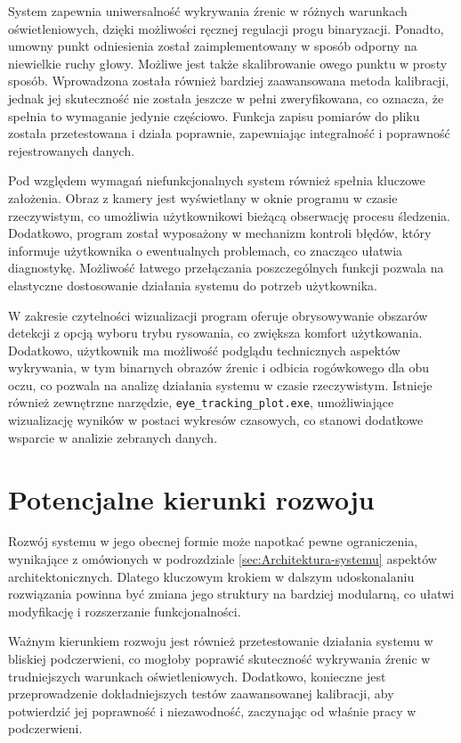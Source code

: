 \documentclass[a4paper,twoside,12pt]{book}
\begin{document}
System zapewnia uniwersalność wykrywania źrenic w różnych warunkach oświetleniowych, dzięki możliwości ręcznej regulacji progu binaryzacji. Ponadto, umowny punkt odniesienia został zaimplementowany w sposób odporny na niewielkie ruchy głowy. Możliwe jest także skalibrowanie owego punktu w prosty sposób. Wprowadzona została również bardziej zaawansowana metoda kalibracji, jednak jej skuteczność nie została jeszcze w pełni zweryfikowana, co oznacza, że spełnia to wymaganie jedynie częściowo. Funkcja zapisu pomiarów do pliku została przetestowana i działa poprawnie, zapewniając integralność i poprawność rejestrowanych danych.

Pod względem wymagań niefunkcjonalnych system również spełnia kluczowe założenia. Obraz z kamery jest wyświetlany w oknie programu w czasie rzeczywistym, co umożliwia użytkownikowi bieżącą obserwację procesu śledzenia. Dodatkowo, program został wyposażony w mechanizm kontroli błędów, który informuje użytkownika o ewentualnych problemach, co znacząco ułatwia diagnostykę. Możliwość łatwego przełączania poszczególnych funkcji pozwala na elastyczne dostosowanie działania systemu do potrzeb użytkownika.

W zakresie czytelności wizualizacji program oferuje obrysowywanie obszarów detekcji z opcją wyboru trybu rysowania, co zwiększa komfort użytkowania. Dodatkowo, użytkownik ma możliwość podglądu technicznych aspektów wykrywania, w tym binarnych obrazów źrenic i odbicia rogówkowego dla obu oczu, co pozwala na analizę działania systemu w czasie rzeczywistym. Istnieje również zewnętrzne narzędzie, \texttt{eye\-\_tracking\-\_plot.exe}, umożliwiające wizualizację wyników w postaci wykresów czasowych, co stanowi dodatkowe wsparcie w analizie zebranych danych.

\section{Potencjalne kierunki rozwoju}

Rozwój systemu w jego obecnej formie może napotkać pewne ograniczenia, wynikające z omówionych w podrozdziale \ref{sec:Architektura-systemu} aspektów architektonicznych. Dlatego kluczowym krokiem w dalszym udoskonalaniu rozwiązania powinna być zmiana jego struktury na bardziej modularną, co ułatwi modyfikację i rozszerzanie funkcjonalności.

Ważnym kierunkiem rozwoju jest również przetestowanie działania systemu w bliskiej podczerwieni, co mogłoby poprawić skuteczność wykrywania źrenic w trudniejszych warunkach oświetleniowych. Dodatkowo, konieczne jest przeprowadzenie dokładniejszych testów zaawansowanej kalibracji, aby potwierdzić jej poprawność i niezawodność, zaczynając od właśnie pracy w podczerwieni.
\end{document}

